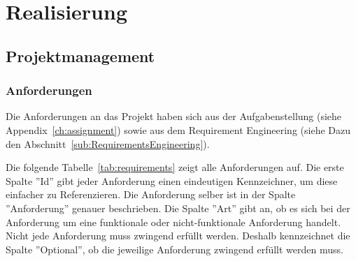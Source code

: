 \chapter{Realisierung}


\section{Projektmanagement}

\subsection{Anforderungen}
\label{sec:Anforderungen}

Die Anforderungen an das Projekt haben sich aus der Aufgabenstellung (siehe Appendix~\ref{ch:assignment}) sowie aus dem Requirement Engineering (siehe Dazu den Abschnitt~\ref{sub:RequirementsEngineering}).

Die folgende Tabelle~\ref{tab:requirements} zeigt alle Anforderungen auf.
Die erste Spalte ''Id'' gibt jeder Anforderung einen eindeutigen Kennzeichner, um diese einfacher zu Referenzieren.
Die Anforderung selber ist in der Spalte ''Anforderung'' genauer beschrieben.
Die Spalte ''Art'' gibt an, ob es sich bei der Anforderung um eine funktionale oder nicht-funktionale Anforderung handelt.
Nicht jede Anforderung muss zwingend erfüllt werden. Deshalb kennzeichnet die Spalte ''Optional'', ob die jeweilige Anforderung zwingend erfüllt werden muss.

